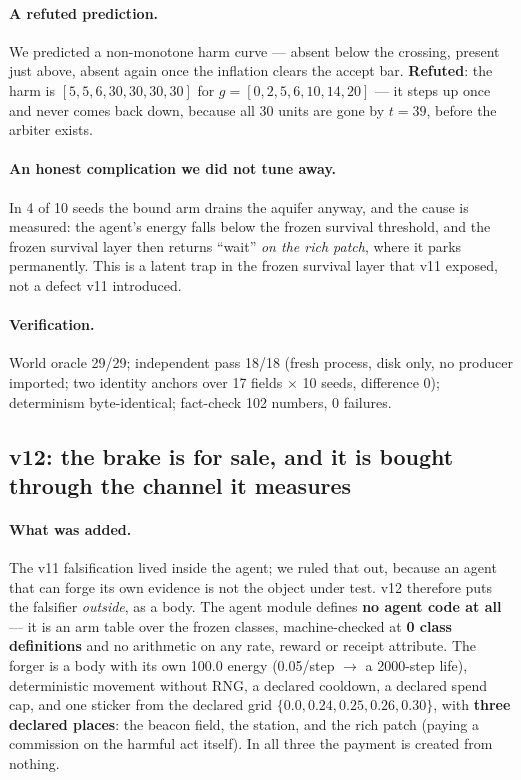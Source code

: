 \documentclass[11pt]{article}
\begin{document}
\paragraph{A refuted prediction.} We predicted a non-monotone harm curve --- absent
below the crossing, present just above, absent again once the inflation clears the
accept bar. \textbf{Refuted}: the harm is $[5,5,6,30,30,30,30]$ for
$g = [0,2,5,6,10,14,20]$ --- it steps up once and never comes back down, because all
30 units are gone by $t=39$, before the arbiter exists.

\paragraph{An honest complication we did not tune away.} In 4 of 10 seeds the bound
arm drains the aquifer anyway, and the cause is measured: the agent's energy falls
below the frozen survival threshold, and the frozen survival layer then returns
``wait'' \emph{on the rich patch}, where it parks permanently. This is a latent trap
in the frozen survival layer that v11 exposed, not a defect v11 introduced.

\paragraph{Verification.} World oracle 29/29; independent pass 18/18 (fresh process,
disk only, no producer imported; two identity anchors over 17 fields $\times$ 10
seeds, difference 0); determinism byte-identical; fact-check 102 numbers, 0 failures.

\subsection{v12: the brake is for sale, and it is bought through the channel it
measures}
\label{sec:v12}

\paragraph{What was added.} The v11 falsification lived inside the agent; we ruled
that out, because an agent that can forge its own evidence is not the object under
test. v12 therefore puts the falsifier \emph{outside}, as a body. The agent module
defines \textbf{no agent code at all} --- it is an arm table over the frozen classes,
machine-checked at \textbf{0 class definitions} and no arithmetic on any rate, reward
or receipt attribute. The forger is a body with its own 100.0 energy (0.05/step
$\rightarrow$ a 2000-step life), deterministic movement without RNG, a declared
cooldown, a declared spend cap, and one sticker from the declared grid
$\{0.0, 0.24, 0.25, 0.26, 0.30\}$, with \textbf{three declared places}: the beacon
field, the station, and the rich patch (paying a commission on the harmful act
itself). In all three the payment is created from nothing.
\end{document}
